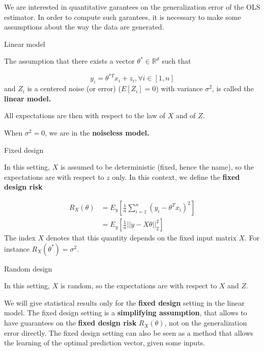 \documentclass[
10pt, %
a4paper, %
oneside, %
headinclude,footinclude, %
BCOR5mm, %
]{scrartcl}
\begin{document}
We are interested in quantitative garantees on the generalization error of the OLS estimator. In order to compute such garantees, it is necessary to make some assumptions about the way the data are generated.

\begin{definition}{Linear model}

    The assumption that there exists a vector $ \theta^*\in \mathbb{R}^d$ such that 

    \begin{equation*}
	y_i = \theta^{*T}x_i+z_i, \forall i\in [1, n]
    \end{equation*}
    and $Z_i$ is a centered noise (or error)  ($E[Z_i]=0$) with variance $ \sigma^2$, is called the \textbf{{linear model.}} 
\end{definition}

All expectations are then with respect to the law of $X$ and of $Z$.

\begin{remark}

    When $\sigma^2=0$, we are in the \textbf{{noiseless model.}} 
    
\end{remark}

\begin{definition}{Fixed design}

    In this setting, $X$ is assumed to be deterministic (fixed, hence the name), so the expectations are with respect to $z$ only. In this context, we define the \textbf{{fixed design risk}} 

    \begin{equation}
	\begin{aligned}
	    \label{eq:}
	    R_X(\theta)    &= E_y[ \frac{1}{n} \sum^{n}_{i=1} (y_i-\theta^Tx_i)^2]\\
	    &= E_y[ \frac{1}{n} ||y-X\theta||_2^2]
	\end{aligned}
    \end{equation}
    The index $X$ denotes that this quantity depends on the fixed input matrix $X$. For instance $ R_X(\theta^*) = \sigma^2$. 
\end{definition}

\begin{definition}{Random design}

    In this setting, $X$ is random, so the expectations are with respect to $X$ and $Z$.
\end{definition}

We will give statistical results only for the \textbf{{fixed design}} setting in the linear model. The fixed design setting is a \textbf{{simplifying assumption}}, that allows to have guarantees on the \textbf{{fixed design risk}} $R_X(\theta)$, not on the generalization error directly. The fixed design setting can also be seen as a method that allows the learning of the optimal prediction vector, given some inputs.
\end{document}
